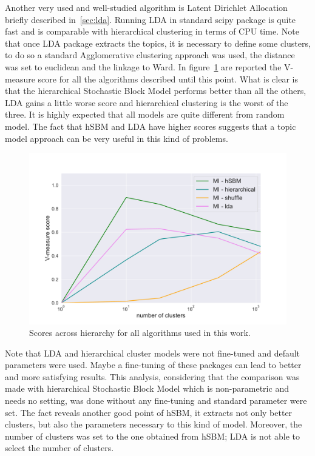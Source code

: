 Another very used and well-studied algorithm is Latent Dirichlet Allocation briefly described in~\ref{sec:lda}. Running LDA in standard scipy package is quite fast and is comparable with hierarchical clustering in terms of CPU time. Note that once LDA package extracts the topics, it is necessary to define some clusters, to do so a standard Agglomerative clustering approach was used, the distance was set to euclidean and the linkage to Ward. In figure~\ref{fig:topic/gtex/oversigma_10tissue/metric_scores_all} are reported the V-measure score for all the algorithms described until this point. What is clear is that the hierarchical Stochastic Block Model performs better than all the others, LDA gains a little worse score and hierarchical clustering is the worst of the three. It is highly expected that all models are quite different from random model. The fact that hSBM and LDA have higher scores suggests that a topic model approach can be very useful in this kind of problems. 
\begin{figure}[htb!]
    \centering
    \includegraphics[width=0.9\linewidth]{pictures/topic/gtex/oversigma_10tissue/metric_scores_all.pdf}
    \caption{Scores across hierarchy for all algorithms used in this work.}
    \label{fig:topic/gtex/oversigma_10tissue/metric_scores_all}
\end{figure}
Note that LDA and hierarchical cluster models were not fine-tuned and default parameters were used. Maybe a fine-tuning of these packages can lead to better and more satisfying results. This analysis, considering that the comparison was made with hierarchical Stochastic Block Model which is non-parametric and needs no setting, was done without any fine-tuning and standard parameter were set. The fact reveals another good point of hSBM, it extracts not only better clusters, but also the parameters necessary to this kind of model. Moreover, the number of clusters was set to the one obtained from hSBM; LDA is not able to select the number of clusters.

